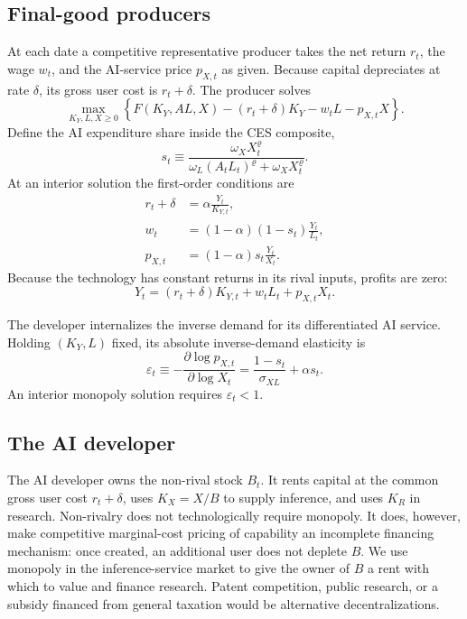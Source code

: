 \subsection{Final-good producers}

At each date a competitive representative producer takes the net return $r_t$, the wage $w_t$, and the AI-service price $p_{X,t}$ as given. Because capital depreciates at rate $\delta$, its gross user cost is $r_t+\delta$. The producer solves
\begin{equation}
 \max_{K_Y,L,X\geq0}
 \left\{F(K_Y,AL,X)-(r_t+\delta)K_Y-w_tL-p_{X,t}X\right\}.
 \label{eq:final-firm}
\end{equation}
Define the AI expenditure share inside the CES composite,
\begin{equation}
 s_t\equiv
 \frac{\omega_XX_t^{\varrho}}
      {\omega_L(A_tL_t)^{\varrho}+\omega_XX_t^{\varrho}}.
 \label{eq:s-share}
\end{equation}
At an interior solution the first-order conditions are
\begin{align}
 r_t+\delta&=\alpha\frac{Y_t}{K_{Y,t}},
 \label{eq:firm-FOC-K}\\
 w_t&=(1-\alpha)(1-s_t)\frac{Y_t}{L_t},
 \label{eq:firm-FOC-L}\\
 p_{X,t}&=(1-\alpha)s_t\frac{Y_t}{X_t}.
 \label{eq:firm-FOC-X}
\end{align}
Because the technology has constant returns in its rival inputs, profits are zero:
\begin{equation}
 Y_t=(r_t+\delta)K_{Y,t}+w_tL_t+p_{X,t}X_t.
 \label{eq:final-zero-profit}
\end{equation}

The developer internalizes the inverse demand for its differentiated AI service. Holding $(K_Y,L)$ fixed, its absolute inverse-demand elasticity is
\begin{equation}
 \varepsilon_t
 \equiv-\frac{\partial\log p_{X,t}}{\partial\log X_t}
 =\frac{1-s_t}{\sigma_{XL}}+\alpha s_t.
 \label{eq:inverse-demand-elasticity}
\end{equation}
An interior monopoly solution requires $\varepsilon_t<1$.

\subsection{The AI developer}

The AI developer owns the non-rival stock $B_t$. It rents capital at the common gross user cost $r_t+\delta$, uses $K_X=X/B$ to supply inference, and uses $K_R$ in research. Non-rivalry does not technologically require monopoly. It does, however, make competitive marginal-cost pricing of capability an incomplete financing mechanism: once created, an additional user does not deplete $B$. We use monopoly in the inference-service market to give the owner of $B$ a rent with which to value and finance research. Patent competition, public research, or a subsidy financed from general taxation would be alternative decentralizations.

